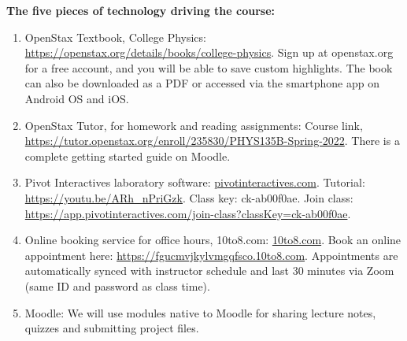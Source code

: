 \documentclass[10pt]{article}
\begin{document}
\textbf{The five pieces of technology driving the course:}
\begin{enumerate}
\item OpenStax Textbook, College Physics: \url{https://openstax.org/details/books/college-physics}.  Sign up at openstax.org for a free account, and you will be able to save custom highlights.  The book can also be downloaded as a PDF or accessed via the smartphone app on Android OS and iOS.
\item OpenStax Tutor, for homework and reading assignments: Course link, \url{https://tutor.openstax.org/enroll/235830/PHYS135B-Spring-2022}.  There is a complete getting started guide on Moodle.
\item Pivot Interactives laboratory software: \url{pivotinteractives.com}. Tutorial: \url{https://youtu.be/ARh_nPriGzk}.  Class key: ck-ab00f0ae.  Join class: \url{https://app.pivotinteractives.com/join-class?classKey=ck-ab00f0ae}.
\item Online booking service for office hours, 10to8.com: \url{10to8.com}.  Book an online appointment here: \url{https://fgucmvjkylvmgqfsco.10to8.com}.  Appointments are automatically synced with instructor schedule and last 30 minutes via Zoom (same ID and password as class time).
\item Moodle: We will use modules native to Moodle for sharing lecture notes, quizzes and submitting project files. 
\end{enumerate}
\end{document}
